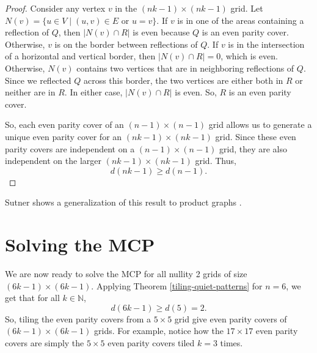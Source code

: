 \documentclass[a4paper]{article}
\newcommand{\N}{\mathbb{N}}
\newcommand{\abs}[1]{\left| #1 \right|}
\begin{document}
\begin{proof}
		Consider any vertex $v$ in the $(nk-1) \times (nk-1)$ grid.
		Let $N(v) = \{u \in V \mid (u,v) \in E \text{ or } u=v\}$.
		If $v$ is in one of the areas containing a reflection of $Q$, then $\abs{N(v) \cap R}$ is even because $Q$ is an even parity cover.
		Otherwise, $v$ is on the border between reflections of $Q$.
		If $v$ is in the intersection of a horizontal and vertical border, then $\abs{N(v) \cap R} = 0$, which is even.
		Otherwise, $N(v)$ contains two vertices that are in neighboring reflections of $Q$.
		Since we reflected $Q$ across this border, the two vertices are either both in $R$ or neither are in $R$.
		In either case, $\abs{N(v) \cap R}$ is even.
		So, $R$ is an even parity cover.
		
		So, each even parity cover of an $(n-1) \times (n-1)$ grid allows us to generate a unique even parity cover for an $(nk-1) \times (nk-1)$ grid.
		Since these even parity covers are independent on a $(n-1) \times (n-1)$ grid, they are also independent on the larger $(nk-1) \times (nk-1)$ grid.
		Thus,
		\begin{equation*}
			d(nk-1) \geq d(n-1).
		\end{equation*}
	\end{proof}

	Sutner shows a generalization of this result to product graphs \cite{Sutner1988_2}.

	\section{Solving the MCP}
	We are now ready to solve the MCP for all nullity 2 grids of size $(6k-1) \times (6k-1)$.
	Applying Theorem \ref{tiling-quiet-patterns} for $n=6$, we get that for all $k \in \N$,
	\begin{equation*}
		d(6k - 1) \geq d(5) = 2.
	\end{equation*}
	So, tiling the even parity covers from a $5 \times 5$ grid give even parity covers of $(6k-1) \times (6k-1)$ grids.
	For example, notice how the $17 \times 17$ even parity covers are simply the $5 \times 5$ even parity covers tiled $k=3$ times.
	
\end{document}
